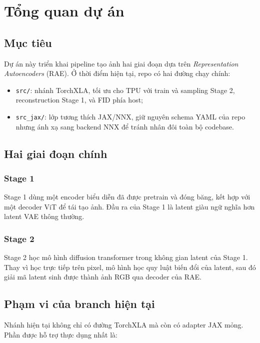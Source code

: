 \section{Tổng quan dự án}

\subsection{Mục tiêu}

Dự án này triển khai pipeline tạo ảnh hai giai đoạn dựa trên
\textit{Representation Autoencoders} (RAE). Ở thời điểm hiện tại, repo có hai
đường chạy chính:

\begin{itemize}[leftmargin=1.5em]
  \item \texttt{src/}: nhánh TorchXLA, tối ưu cho TPU với train và sampling
  Stage 2, reconstruction Stage 1, và FID phía host;
  \item \texttt{src\_jax/}: lớp tương thích JAX/NNX, giữ nguyên schema YAML của
  repo nhưng ánh xạ sang backend NNX để tránh nhân đôi toàn bộ codebase.
\end{itemize}

\subsection{Hai giai đoạn chính}

\subsubsection{Stage 1}

Stage 1 dùng một encoder biểu diễn đã được pretrain và đóng băng, kết hợp với
một decoder ViT để tái tạo ảnh. Đầu ra của Stage 1 là latent giàu ngữ nghĩa hơn
latent VAE thông thường.

\subsubsection{Stage 2}

Stage 2 học mô hình diffusion transformer trong không gian latent của Stage 1.
Thay vì học trực tiếp trên pixel, mô hình học quy luật biến đổi của latent, sau
đó giải mã latent sinh được thành ảnh RGB qua decoder của RAE.

\subsection{Phạm vi của branch hiện tại}

Nhánh hiện tại không chỉ có đường TorchXLA mà còn có adapter JAX mỏng. Phần được
hỗ trợ thực dụng nhất là:

